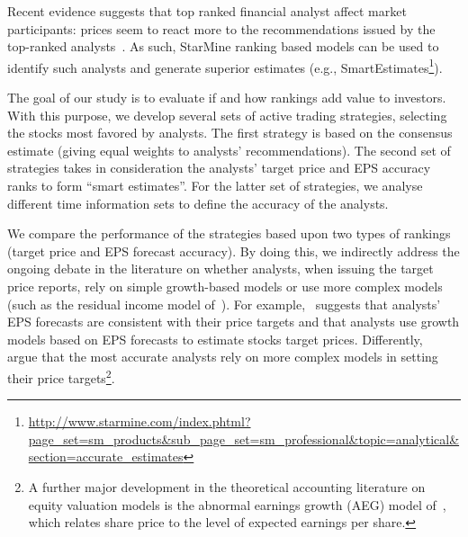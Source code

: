 \documentclass[a4paper,twoside,12pt,openright,notitlepage]{report}\usepackage[]{graphicx}\usepackage[]{color}
\begin{document}
Recent evidence suggests that top ranked financial analyst affect market participants: prices seem to react more to the recommendations issued by the top-ranked analysts~\citep{emery2009}. As such, StarMine ranking based models can be used to identify such analysts and generate superior estimates (e.g., SmartEstimates\footnote{\url{http://www.starmine.com/index.phtml?page_set=sm_products&sub_page_set=sm_professional&topic=analytical&section=accurate_estimates}}).



The goal of our study is to evaluate if and how rankings  add value to investors.  With this purpose, we develop several sets of active trading strategies, selecting the stocks most favored by analysts. The first strategy is based on the consensus estimate (giving equal weights to analysts' recommendations). The second set of strategies takes in consideration the analysts' target price and EPS accuracy ranks to form ``smart estimates''. For the latter set of strategies, we analyse different time information sets to define the accuracy of the analysts.


We compare the performance of the strategies based upon two types of rankings (target price and EPS forecast accuracy). By doing this, we indirectly address the ongoing debate in the literature on whether analysts, when issuing the target price reports, rely on simple growth-based models or use more complex models (such as the residual income model of~\cite{ohlson1995}). For example,~\cite{bradshaw2004} suggests that analysts' EPS forecasts are consistent with their price targets and that analysts use growth models based on EPS forecasts to estimate stocks target prices. Differently,~\cite{simon2011} argue that the most accurate analysts rely on more complex models in setting their price targets\footnote{A further major development in the theoretical accounting literature on equity valuation models is the abnormal earnings growth (AEG) model of~\cite{ohlson2005}, which relates share price to the level of expected earnings per share.}.



\end{document}
